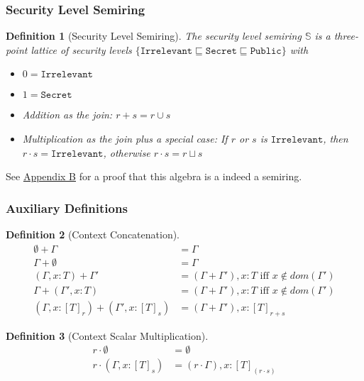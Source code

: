 \documentclass[conference]{IEEEtran}
\newcommand\public{\texttt{Public}}
\newcommand\secret{\texttt{Secret}}
\newcommand\irrele{\texttt{Irrelevant}}
\newtheorem{definition}{Definition}
\begin{document}
\subsubsection{Security Level Semiring}

\begin{definition}[Security Level Semiring]
The security level semiring $\mathbb{S}$ is a three-point lattice of security levels $\{\irrele\sqsubseteq\secret\sqsubseteq\public\}$ with 
\begin{itemize}
	\item $0=\irrele$
	\item $1=\secret$
	\item Addition as the join: $r+s=r\cup s$
	\item Multiplication as the join plus a special case: If $r$ or $s$ is $\irrele$, then $r\cdot s=\irrele$, otherwise $r\cdot s=r\sqcup s$
\end{itemize}
\end{definition}
See \hyperref[app-b]{Appendix B} for a proof that this algebra is a indeed a semiring.

\subsubsection{Auxiliary Definitions}
\label{def-concat}
\begin{definition}[Context Concatenation]
    $$
    \begin{aligned}
        \emptyset+\Gamma&=\Gamma\\
        \Gamma+\emptyset&=\Gamma\\
        (\Gamma,x:T)+\Gamma'&=(\Gamma+\Gamma'),x:T\text{ iff }x\notin dom(\Gamma')\\
        \Gamma+(\Gamma',x:T)&=(\Gamma+\Gamma'),x:T\text{ iff }x\notin dom(\Gamma')\\
        (\Gamma,x:[T]_r)+(\Gamma',x:[T]_s)&=(\Gamma+\Gamma'),x:[T]_{r+s}
    \end{aligned}
    $$
\end{definition}
\label{def-mul}
\begin{definition}[Context Scalar Multiplication]
    $$
    \begin{aligned}
    r\cdot\emptyset&=\emptyset\\
    r\cdot(\Gamma,x:[T]_s)&=(r\cdot\Gamma),x:[T]_{(r\cdot s)}\\
    \end{aligned}
    $$
\end{definition}
\end{document}
